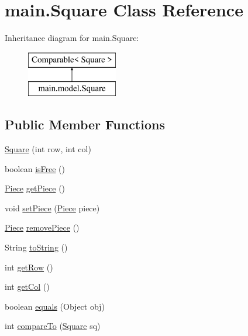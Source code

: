 \hypertarget{classmain_1_1_square}{}\section{main.\+Square Class Reference}
\label{classmain_1_1_square}
Inheritance diagram for main.\+Square\+:\begin{figure}[H]
\begin{center}
\leavevmode
\includegraphics[height=2.000000cm]{classmain_1_1_square}
\end{center}
\end{figure}
\subsection*{Public Member Functions}
\begin{DoxyCompactItemize}
\item 
\hyperlink{classmain_1_1_square_a52d3cfb1051c70b9d4e93b0d2a61139d}{Square} (int row, int col)
\item 
boolean \hyperlink{classmain_1_1_square_a42b707aea36ab8c262f628f2898e7871}{is\+Free} ()
\item 
\hyperlink{classmain_1_1pieces_1_1_piece}{Piece} \hyperlink{classmain_1_1_square_a9a16ed1a85d53917e47740991da16e5e}{get\+Piece} ()
\item 
void \hyperlink{classmain_1_1_square_a4f5e9f6ce14d4605c6515c25c3a6022d}{set\+Piece} (\hyperlink{classmain_1_1pieces_1_1_piece}{Piece} piece)
\item 
\hyperlink{classmain_1_1pieces_1_1_piece}{Piece} \hyperlink{classmain_1_1_square_a182b58082ad0f3af6d5a894ff02ebeac}{remove\+Piece} ()
\item 
String \hyperlink{classmain_1_1_square_a58f1df3521479cfc4a9aaaaf86c8de05}{to\+String} ()
\item 
int \hyperlink{classmain_1_1_square_ac8d25b3eeb8bfa437a2aaceb16965339}{get\+Row} ()
\item 
int \hyperlink{classmain_1_1_square_a884a6ec3ece471079c602b5f45f0ae7e}{get\+Col} ()
\item 
boolean \hyperlink{classmain_1_1_square_ae5859b983c912011a6adfc679abc8ff1}{equals} (Object obj)
\item 
int \hyperlink{classmain_1_1_square_a7510832ff95defe547865c5869bd591a}{compare\+To} (\hyperlink{classmain_1_1_square}{Square} sq)
\end{DoxyCompactItemize}


